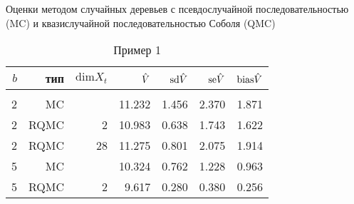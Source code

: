 \begin{table}
    \renewcommand{\arraystretch}{0.6}
    \centering
    Оценки методом случайных деревьев с псевдослучайной последовательностью (MC) и квазислучайной последовательностью Соболя (QMC)
    \caption{Пример 1}\label{tbl:random_tree_sobol_ex1}
    \begin{tabular}{rrrrrrr}
        $b$&тип&$\mathrm{dim} X_t$&$\hat{V}$&$\mathrm{sd}\hat{V}$&$\mathrm{se}\hat{V}$&$\mathrm{bias}\hat{V}$\\[3pt]\hline\\[-8pt]
        2&MC&&11.232&1.456&2.370&1.871\\
        2&RQMC&2&10.983&0.638&1.743&1.622\\
        2&RQMC&28&11.275&0.801&2.075&1.914\\[3pt]
        5&MC&&10.324&0.762&1.228&0.963\\
        5&RQMC&2&9.617&0.280&0.380&0.256\\[3pt]
    \end{tabular}




\end{table}
